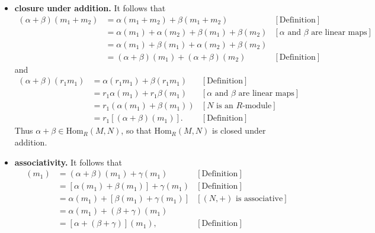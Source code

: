\documentclass[9pt]{article}
\begin{document}
\begin{enumerate}
      \begin{itemize}
         \item \textbf{closure under addition.} It follows that
               \begin{align*}
                  (\alpha + \beta)(m_1 +m_2) &= \alpha(m_1+m_2) + \beta(m_1+m_2)
                     &[\text{Definition}] \\
                     &= \alpha(m_1) + \alpha(m_2) + \beta(m_1) + \beta(m_2)
                        &[\alpha \text{ and } \beta \text{ are linear maps}] \\
                     &= \alpha(m_1) + \beta(m_1) + \alpha(m_2) + \beta(m_2) \\
                     &= (\alpha+\beta)(m_1) + (\alpha+\beta)(m_2)
                        &[\text{Definition}] 
               \end{align*}
               and
               \begin{align*}
                  (\alpha + \beta)(r_1m_1) &= \alpha(r_1m_1) + \beta(r_1m_1)
                     &[\text{Definition}] \\
                     &= r_1\alpha(m_1) + r_1\beta(m_1)
                        &[\alpha \text{ and } \beta \text{ are linear maps}] \\
                     &= r_1(\alpha(m_1) + \beta(m_1))  &[N \text{ is an } R\text{-module}]\\
                     &= r_1[(\alpha+\beta)(m_1)]. &[\text{Definition}] 
               \end{align*}
               Thus $\alpha+\beta \in \text{Hom}_R(M, N)$, so that
               $\text{Hom}_R(M, N)$ is closed under addition.
         \item \textbf{associativity.} It follows that
               \begin{align*}
                  [(\alpha + \beta) + \gamma](m_1) &=
                     (\alpha+\beta)(m_1) + \gamma(m_1) &[\text{Definition}] \\
                     &= [\alpha(m_1) + \beta(m_1)] + \gamma(m_1)
                        &[\text{Definition}] \\
                     &= \alpha(m_1) + [\beta(m_1) + \gamma(m_1)]
                        &[(N, +) \text{ is associative}] \\
                     &= \alpha(m_1) + (\beta+\gamma)(m_1) \\
                     &= [\alpha + (\beta + \gamma)](m_1), &[\text{Definition}]
               \end{align*}

\end{itemize}
\end{enumerate}
\end{document}
